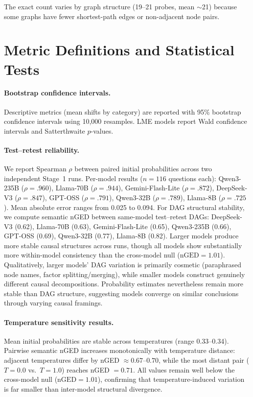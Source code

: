 \documentclass[11pt]{article}
\begin{document}
The exact count varies by graph structure (19--21 probes, mean ${\sim}$21) because some graphs have fewer shortest-path edges or non-adjacent node pairs.

\section{Metric Definitions and Statistical Tests}
\label{app:metrics}

\paragraph{Bootstrap confidence intervals.} Descriptive metrics (mean shifts by category) are reported with 95\% bootstrap confidence intervals using 10,000 resamples. LME models report Wald confidence intervals and Satterthwaite $p$-values.

\paragraph{Test--retest reliability.} We report Spearman $\rho$ between paired initial probabilities across two independent Stage~1 runs. Per-model results ($n = 116$ questions each): Qwen3-235B ($\rho = .960$), Llama-70B ($\rho = .944$), Gemini-Flash-Lite ($\rho = .872$), DeepSeek-V3 ($\rho = .847$), GPT-OSS ($\rho = .791$), Qwen3-32B ($\rho = .789$), Llama-8B ($\rho = .725$). Mean absolute error ranges from 0.025 to 0.094. For DAG structural stability, we compute semantic nGED between same-model test--retest DAGs: DeepSeek-V3 (0.62), Llama-70B (0.63), Gemini-Flash-Lite (0.65), Qwen3-235B (0.66), GPT-OSS (0.69), Qwen3-32B (0.77), Llama-8B (0.82). Larger models produce more stable causal structures across runs, though all models show substantially more within-model consistency than the cross-model null ($\text{nGED} = 1.01$). Qualitatively, larger models' DAG variation is primarily cosmetic (paraphrased node names, factor splitting/merging), while smaller models construct genuinely different causal decompositions. Probability estimates nevertheless remain more stable than DAG structure, suggesting models converge on similar conclusions through varying causal framings.

\paragraph{Temperature sensitivity results.} Mean initial probabilities are stable across temperatures (range 0.33--0.34). Pairwise semantic nGED increases monotonically with temperature distance: adjacent temperatures differ by nGED $\approx 0.67$--$0.70$, while the most distant pair ($T = 0.0$ vs.\ $T = 1.0$) reaches nGED $= 0.71$. All values remain well below the cross-model null ($\text{nGED} = 1.01$), confirming that temperature-induced variation is far smaller than inter-model structural divergence.
\end{document}
